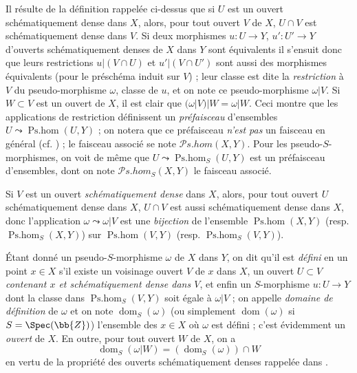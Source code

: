 \begin{env}[20.2.2]
Il résulte de la définition rappelée ci-dessus que si $U$ est un ouvert schématiquement dense dans $X$, alors, pour tout ouvert $V$ de $X$, $U\cap V$ est schématiquement dense dans $V$.
Si deux morphismes $u:U\to Y$, $u':U'\to Y$ d'ouverts schématiquement denses de $X$ dans $Y$ sont équivalents il s'ensuit donc que leurs restrictions $u|(V\cap U)$ et $u'|(V\cap U')$ sont aussi des morphismes équivalents (pour le préschéma induit sur $V$) ; leur classe est dite la \emph{restriction} à $V$ du pseudo-morphisme $\omega$, classe de $u$, et on note ce pseudo-morphisme $\omega|V$.
Si $W\subset V$ est un ouvert de $X$, il est clair que $(\omega|V)|W=\omega|W$.
Ceci montre que les applications de restriction définissent un \emph{préfaisceau} d'ensembles $U\leadsto\operatorname{Ps.hom}(U,Y)$ ; on notera que ce préfaisceau \emph{n'est pas} un faisceau en général (cf. ) ; le faisceau associé se note $\mathscr{P}\!s.\!\mathit{hom}(X,Y)$.
Pour les pseudo-$S$-morphismes, on voit de même que $U\leadsto\operatorname{Ps.hom}_S(U,Y)$ est un préfaisceau d'ensembles, dont on note $\mathscr{P}\!s.\!\mathit{hom}_S(X,Y)$ le faisceau associé.

Si $V$ est un ouvert \emph{schématiquement dense} dans $X$, alors, pour tout ouvert $U$ schématiquement dense dans $X$, $U\cap V$ est aussi schématiquement dense dans $X$, donc l'application $\omega\leadsto\omega|V$ est une \emph{bijection} de l'ensemble $\operatorname{Ps.hom}(X,Y)$ (resp. $\operatorname{Ps.hom}_S(X,Y)$) sur $\operatorname{Ps.hom}(V,Y)$ (resp. $\operatorname{Ps.hom}_S(V,Y)$).
\end{env}

\begin{env}[20.2.3]
Étant donné un pseudo-$S$-morphisme $\omega$ de $X$ dans $Y$, on dit qu'il est \emph{défini} en un point $x\in X$ s'il existe un voisinage ouvert $V$ de $x$ dans $X$, un ouvert $U\subset V$ \emph{contenant $x$ et schématiquement dense dans $V$}, et enfin un $S$-morphisme $u:U\to Y$ dont la classe dans $\operatorname{Ps.hom}_S(V,Y)$ soit égale à $\omega|V$  ; on appelle \emph{domaine de définition} de $\omega$ et on note $\operatorname{dom}_S(\omega)$ (ou simplement $\operatorname{dom}(\omega)$ si $S=\Spec(\bb{Z})$) l'ensemble des $x\in X$ où $\omega$ est défini ; c'est évidemment un \emph{ouvert} de $X$.
En outre, pour tout ouvert $W$ de $X$, on a
\[
\label{IV.20.2.3.1}
  \operatorname{dom}_S(\omega|W)=(\operatorname{dom}_S(\omega))\cap W
  \tag{20.2.3.1}
\]
en vertu de la propriété des ouverts schématiquement denses rappelée dans .
\end{env}

